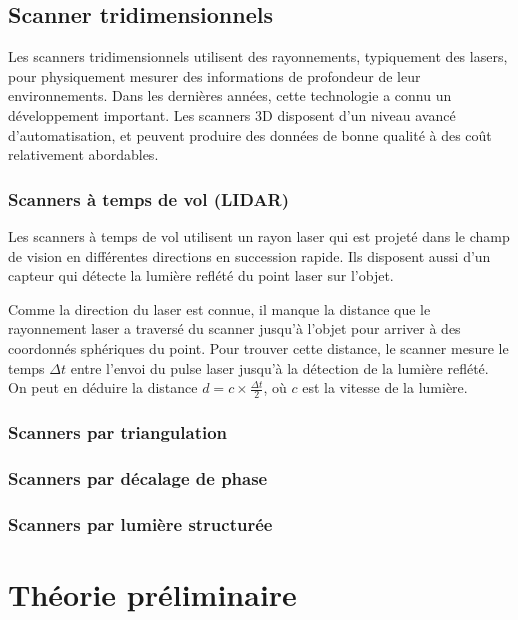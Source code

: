 \documentclass[a4paper,10pt]{scrreprt}
\begin{document}
\subsection{Scanner tridimensionnels}
Les scanners tridimensionnels utilisent des rayonnements, typiquement des lasers, pour physiquement mesurer des informations de profondeur de leur environnements. Dans les dernières années, cette technologie a connu un développement important. Les scanners 3D disposent d'un niveau avancé d'automatisation, et peuvent produire des données de bonne qualité \cite{Grus2012} à des coût relativement abordables.

\subsubsection{Scanners à temps de vol (LIDAR)}
Les scanners à temps de vol utilisent un rayon laser qui est projeté dans le champ de vision en différentes directions en succession rapide. Ils disposent aussi d'un capteur qui détecte la lumière reflété du point laser sur l'objet.

Comme la direction du laser est connue, il manque la distance que le rayonnement laser a traversé du scanner jusqu'à l'objet pour arriver à des coordonnés sphériques du point. Pour trouver cette distance, le scanner mesure le temps $\Delta t$ entre l'envoi du pulse laser jusqu'à la détection de la lumière reflété. On peut en déduire la distance $d = c \times \frac{\Delta t}{2}$, où $c$ est la vitesse de la lumière.

\subsubsection{Scanners par triangulation}
\subsubsection{Scanners par décalage de phase}
\subsubsection{Scanners par lumière structurée}


\section{Théorie préliminaire}
\end{document}

